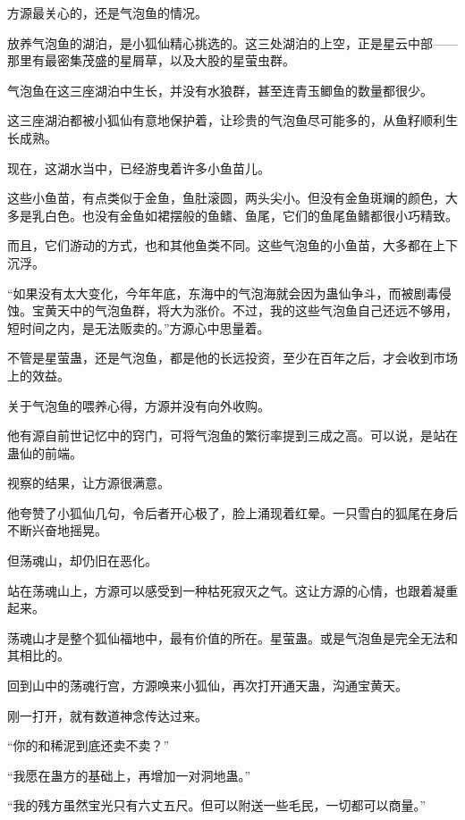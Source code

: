 
\begin{this_body}



方源最关心的，还是气泡鱼的情况。

放养气泡鱼的湖泊，是小狐仙精心挑选的。这三处湖泊的上空，正是星云中部——那里有最密集茂盛的星屑草，以及大股的星萤虫群。

气泡鱼在这三座湖泊中生长，并没有水狼群，甚至连青玉鲫鱼的数量都很少。

这三座湖泊都被小狐仙有意地保护着，让珍贵的气泡鱼尽可能多的，从鱼籽顺利生长成熟。

现在，这湖水当中，已经游曳着许多小鱼苗儿。

这些小鱼苗，有点类似于金鱼，鱼肚滚圆，两头尖小。但没有金鱼斑斓的颜色，大多是乳白色。也没有金鱼如裙摆般的鱼鳍、鱼尾，它们的鱼尾鱼鳍都很小巧精致。

而且，它们游动的方式，也和其他鱼类不同。这些气泡鱼的小鱼苗，大多都在上下沉浮。

“如果没有太大变化，今年年底，东海中的气泡海就会因为蛊仙争斗，而被剧毒侵蚀。宝黄天中的气泡鱼群，将大为涨价。不过，我的这些气泡鱼自己还远不够用，短时间之内，是无法贩卖的。”方源心中思量着。

不管是星萤蛊，还是气泡鱼，都是他的长远投资，至少在百年之后，才会收到市场上的效益。

关于气泡鱼的喂养心得，方源并没有向外收购。

他有源自前世记忆中的窍门，可将气泡鱼的繁衍率提到三成之高。可以说，是站在蛊仙的前端。

视察的结果，让方源很满意。

他夸赞了小狐仙几句，令后者开心极了，脸上涌现着红晕。一只雪白的狐尾在身后不断兴奋地摇晃。

但荡魂山，却仍旧在恶化。

站在荡魂山上，方源可以感受到一种枯死寂灭之气。这让方源的心情，也跟着凝重起来。

荡魂山才是整个狐仙福地中，最有价值的所在。星萤蛊。或是气泡鱼是完全无法和其相比的。

回到山中的荡魂行宫，方源唤来小狐仙，再次打开通天蛊，沟通宝黄天。

刚一打开，就有数道神念传达过来。

“你的和稀泥到底还卖不卖？”

“我愿在蛊方的基础上，再增加一对洞地蛊。”

“我的残方虽然宝光只有六丈五尺。但可以附送一些毛民，一切都可以商量。”


\end{this_body}
